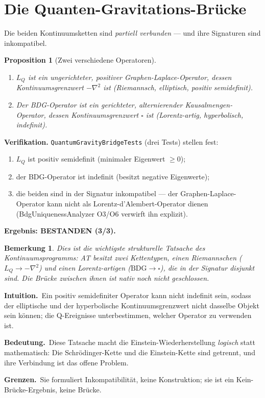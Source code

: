 \documentclass[10pt,twoside,openany]{book}
\newtheorem{proposition}[theorem]{Proposition}
\newtheorem{remark}[theorem]{Bemerkung}
\newcommand{\theoremnotes}[3]{%
  \par\medskip\noindent
  \textbf{Intuition.}\ #1\par
  \textbf{Bedeutung.}\ #2\par
  \textbf{Grenzen.}\ #3\par}
\begin{document}
\section{Die Quanten-Gravitations-Brücke}
\label{ch:bridge}

Die beiden Kontinuumsketten sind \emph{partiell verbunden} — und ihre Signaturen sind
inkompatibel.

\begin{proposition}[Zwei verschiedene Operatoren]
\begin{enumerate}
\item $L_Q$ ist ein \emph{ungerichteter, positiver} Graphen-Laplace-Operator, dessen
Kontinuumsgrenzwert $-\nabla^2$ ist (Riemannsch, elliptisch, positiv semidefinit).
\item Der BDG-Operator ist ein \emph{gerichteter, alternierender} Kausalmengen-Operator,
dessen Kontinuumsgrenzwert $\square$ ist (Lorentz-artig, hyperbolisch, indefinit).
\end{enumerate}
\end{proposition}

\textbf{Verifikation.} \texttt{QuantumGravityBridgeTests} (drei Tests) stellen fest:
\begin{enumerate}
\item $L_Q$ ist positiv semidefinit (minimaler Eigenwert $\ge0$);
\item der BDG-Operator ist indefinit (besitzt negative Eigenwerte);
\item die beiden sind in der Signatur inkompatibel — der Graphen-Laplace-Operator kann
nicht als Lorentz-d'Alembert-Operator dienen (BdgUniquenessAnalyzer O3/O6 verwirft ihn
explizit).
\end{enumerate}
\textbf{Ergebnis: BESTANDEN (3/3).}

\begin{remark}
Dies ist die wichtigste strukturelle Tatsache des Kontinuumsprogramms: AT besitzt
\emph{zwei} Kettentypen, einen Riemannschen ($L_Q\to-\nabla^2$) und einen
Lorentz-artigen ($\mathrm{BDG}\to\square$), die in der Signatur \emph{disjunkt} sind. Die
Brücke zwischen ihnen ist nativ noch nicht geschlossen.
\end{remark}

\theoremnotes
{Ein positiv semidefiniter Operator kann nicht indefinit sein, sodass der elliptische und
der hyperbolische Kontinuumsgrenzwert nicht dasselbe Objekt sein können; die Q-Ereignisse
unterbestimmen, welcher Operator zu verwenden ist.}
{Diese Tatsache macht die Einstein-Wiederherstellung \emph{logisch} statt mathematisch:
Die Schr\"odinger-Kette und die Einstein-Kette sind getrennt, und ihre Verbindung ist das
offene Problem.}
{Sie formuliert Inkompatibilität, keine Konstruktion; sie ist ein Kein-Brücke-Ergebnis,
keine Brücke.}
\end{document}
